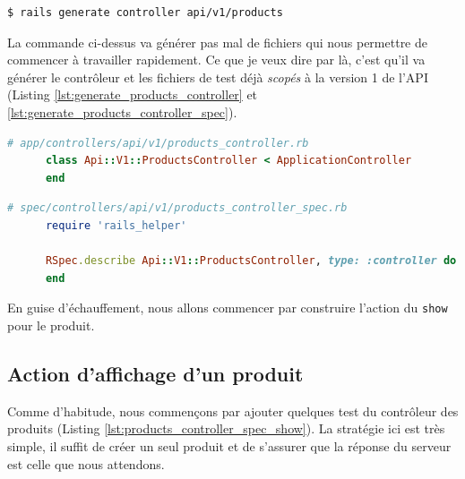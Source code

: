 \documentclass[]{report}
\begin{document}
    \begin{scriptsize}
      \begin{lstlisting}[language=bash]
      $ rails generate controller api/v1/products
      \end{lstlisting}
    \end{scriptsize}

    La commande ci-dessus va générer pas mal de fichiers qui nous permettre de commencer à travailler rapidement. Ce que je veux dire par là, c'est qu'il va générer le contrôleur et les fichiers de test déjà \textit{scopés} à la version 1 de l'API (Listing \ref{lst:generate_products_controller} et \ref{lst:generate_products_controller_spec}).

    \begin{scriptsize}
      \begin{lstlisting}[language=ruby, caption={Le controlleur des produits généré automatqiuement}, label={lst:generate_products_controller}]
      # app/controllers/api/v1/products_controller.rb
      class Api::V1::ProductsController < ApplicationController
      end
      \end{lstlisting}
    \end{scriptsize}

    \begin{scriptsize}
      \begin{lstlisting}[language=ruby, caption={Les test du controlleur des produits généré automatqiuement}, label={lst:generate_products_controller_spec}]
      # spec/controllers/api/v1/products_controller_spec.rb
      require 'rails_helper'

      RSpec.describe Api::V1::ProductsController, type: :controller do
      end
      \end{lstlisting}
    \end{scriptsize}

    En guise d'échauffement, nous allons commencer par construire l'action du \verb|show| pour le produit.

    \subsection{Action d'affichage d'un produit}

      Comme d'habitude, nous commençons par ajouter quelques test du contrôleur des produits (Listing \ref{lst:products_controller_spec_show}). La stratégie ici est très simple, il suffit de créer un seul produit et de s'assurer que la réponse du serveur est celle que nous attendons.
\end{document}
